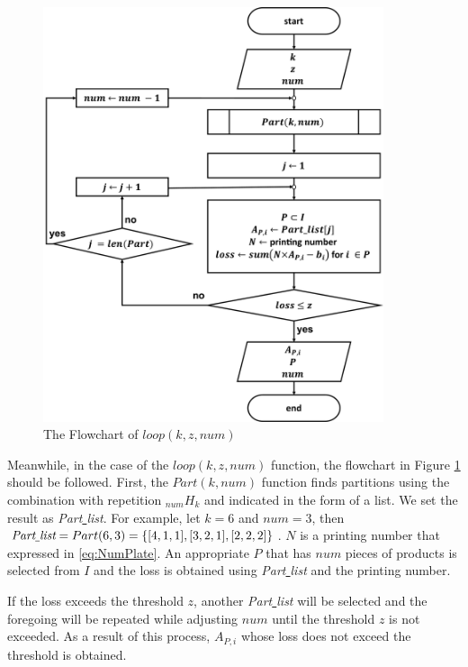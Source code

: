 \documentclass[a4paper]{amsart}
\numberwithin{equation}{section} %
\numberwithin{figure}{section} %
\numberwithin{table}{section}
\theoremstyle{plain}
\theoremstyle{definition}
\theoremstyle{plain}
\theoremstyle{plain}
\theoremstyle{plain}
\theoremstyle{plain}
\theoremstyle{plain}
\begin{document}
\begin{figure}[h!]
	\centering
	\includegraphics[width=10cm]{SubFChart.pdf}
	\caption{The Flowchart of ${loop}(k, z, num)$}
	\label{fig:SFChart}       %
\end{figure}

Meanwhile, in the case of the ${loop}(k, z, num)$ function, the flowchart in Figure \ref{fig:SFChart} should be followed.
First, the ${Part}(k, num)$ function finds partitions using the combination with repetition $_{num}H_{k}$ 
and indicated in the form of a list. 
We set the result as {\it Part\underline{ }list}.
For example, let $k=6$ and $num=3$, then $\text{\it Part\underline{ }list}={Part}(6, 3) = \{ [4,1,1],[3,2,1],[2,2,2] \}$.
$N$ is a printing number that expressed in \eqref{eq:NumPlate}.
An appropriate $P$ that has $num$ pieces of products is selected from $I$ and the loss is obtained using {\it Part\underline{ }list} and the printing number.

If the loss exceeds the threshold $z$, another {\it Part\underline{ }list} will be selected and the foregoing will be repeated  while adjusting $num$ until the threshold $z$ is not exceeded.
As a result of this process, $A_{P,i}$ whose loss does not exceed the threshold is obtained.%
\end{document}
